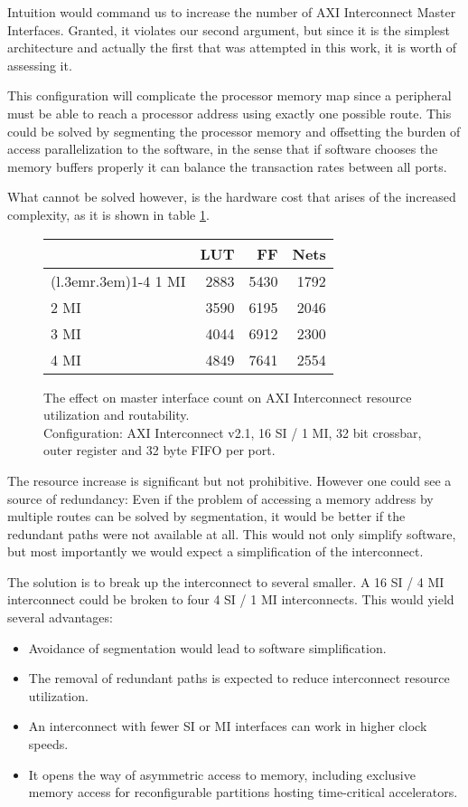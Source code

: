 Intuition would command us to increase the number of AXI Interconnect
Master Interfaces. Granted, it violates our second argument, but since
it is the simplest architecture and actually the first that was attempted
in this work, it is worth of assessing it.

This configuration will complicate the processor memory map
since a peripheral must be able to reach a processor address using
exactly one possible route.
This could be solved by segmenting the processor memory
and offsetting the burden of access parallelization to the software,
in the sense that if software chooses the memory buffers properly
it can balance the \gls{transaction} rates between all ports.

What cannot be solved however, is the hardware cost that arises of the increased
complexity, as it is shown in table \ref{tab:int-mmi}.

\begin{figure}[ht!]
\centering
\begin{tabular}{lrrr}
\toprule
	& LUT	& FF	& Nets \\
\cmidrule(l{.3em}r{.3em}){1-4}
1 MI	& 2883	& 5430	& 1792	\\
2 MI	& 3590	& 6195	& 2046	\\
3 MI	& 4044	& 6912	& 2300	\\
4 MI	& 4849	& 7641	& 2554	\\
\bottomrule
\end{tabular}
\caption{The effect on master interface count on AXI Interconnect resource utilization and routability.\\
	Configuration: AXI Interconnect v2.1, 16 SI / 1 MI, 32 bit crossbar,
	outer register and 32 byte FIFO per port.}
\label{tab:int-mmi}
\end{figure}

The resource increase is significant but not prohibitive.
However one could see a source of redundancy: Even if the problem
of accessing a memory address by multiple routes can be solved by segmentation,
it would be better if the redundant paths were not available at all.
This would not only simplify software, but most importantly we would expect
a simplification of the interconnect.

The solution is to break up the interconnect to several smaller.
A 16 SI / 4 MI interconnect could be
broken to four 4 SI / 1 MI interconnects.
This would yield several advantages:
\begin{itemize}
\item	Avoidance of segmentation would lead to software simplification.
\item	The removal of redundant paths is expected to reduce interconnect resource utilization.
\item	An interconnect with fewer SI or MI interfaces can work in higher clock speeds.
\item	It opens the way of asymmetric access to memory, including exclusive memory access
	for reconfigurable partitions hosting time-critical accelerators.
\end{itemize}

